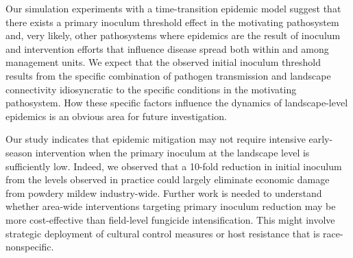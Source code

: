 \documentclass[10pt,a4paper]{article}
\begin{document}
Our simulation experiments with a time-transition epidemic model suggest that there exists a primary inoculum threshold effect in the motivating pathosystem and, very likely, other pathosystems where epidemics are the result of inoculum and intervention efforts that influence disease spread both within and among management units. We expect that the observed initial inoculum threshold results from the specific combination of pathogen transmission and landscape connectivity idiosyncratic to the specific conditions in the motivating pathosystem. How these specific factors influence the dynamics of landscape-level epidemics is an obvious area for future investigation.

Our study indicates that epidemic mitigation may not require intensive early-season intervention when the primary inoculum at the landscape level is sufficiently low. Indeed, we observed that a 10-fold reduction in initial inoculum from the levels observed in practice \parencite{Gent2018} could largely eliminate economic damage from powdery mildew industry-wide. Further work is needed to understand whether area-wide interventions targeting primary inoculum reduction may be more cost-effective than field-level fungicide intensification. This might involve strategic deployment of cultural control measures or host resistance that is race-nonspecific.
\end{document}
